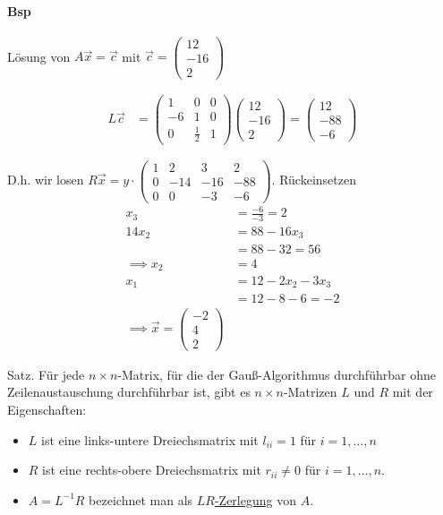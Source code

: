 \documentclass[a4paper,ngerman]{scrbook}
\begin{document}
\paragraph{Bsp}

Lösung von $A\vec{x} = \vec{c}$ mit $\vec{c} =
\begin{pmatrix}
  12\\ -16\\ 2
\end{pmatrix}$

\begin{align*}
  L\vec{c} &=
  \begin{pmatrix}
    1 & 0 & 0\\
    -6 & 1 & 0\\
    0 & \frac{1}{2} & 1
  \end{pmatrix}
  \begin{pmatrix}
    12\\ -16\\ 2
  \end{pmatrix}
  =
  \begin{pmatrix}
    12 \\ -88\\ -6
  \end{pmatrix}
\end{align*}

D.h\@. wir losen $R\vec{x} = y\cdot
\begin{pmatrix}
  1 & 2 & 3 & 2\\
  0 & -14 & -16 & -88 \\
  0 & 0 & -3 & -6
\end{pmatrix}$. Rückeinsetzen
\begin{align*}
  x_3 &= \frac{-6}{-3} = 2\\
  14x_2 &= 88 - 16x_3\\
  &= 88 - 32 = 56\\
  \implies x_2 &= 4\\
  x_1 &= 12 - 2x_2 - 3x_3\\
  &= 12 - 8 - 6 = -2\\
  \implies \vec{x} =
  \begin{pmatrix}
    -2\\ 4\\ 2
  \end{pmatrix}
\end{align*}

Satz. Für jede $n \times n$-Matrix, für die der Gauß-Algorithmus durchführbar ohne Zeilenaustauschung durchführbar ist, gibt es $n\times n$-Matrizen $L$ und $R$ mit der Eigenschaften:
\begin{itemize}
\item $L$ ist eine links-untere Dreiechsmatrix mit $l_{ii} = 1$ für $i=1,\dots,n$
\item $R$ ist eine rechts-obere Dreiechsmatrix mit $r_{ii} \neq 0$ für $i=1,\dots,n$.
\item $A = L^{-1}R$ bezeichnet man als \underline{$LR$-Zerlegung} von $A$.
\end{itemize}
\end{document}

